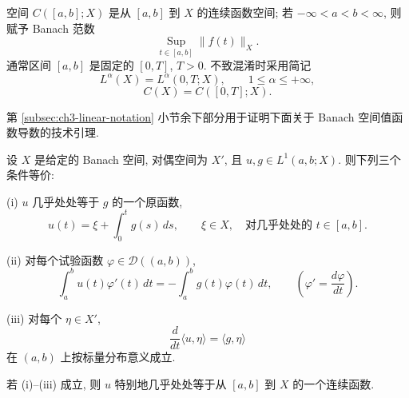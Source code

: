 \hypertarget{chapter-03-page-184}{}
空间 $C([a,b];X)$ 是从 $[a,b]$ 到 $X$ 的连续函数空间; 若 $-\infty<a<b<\infty$, 则赋予 Banach 范数
\begin{equation}
\operatorname*{Sup}_{t\in[a,b]}\lVert f(t)\rVert_X.
\label{eq:ch3-linear-continuous-function-norm}
\end{equation}
通常区间 $[a,b]$ 是固定的 $[0,T]$, $T>0$. 不致混淆时采用简记
\begin{equation}
L^\alpha(X)=L^\alpha(0,T;X),
\qquad1\leq\alpha\leq+\infty,
\label{eq:ch3-linear-condensed-lp-notation}
\end{equation}
\begin{equation}
C(X)=C([0,T];X).
\label{eq:ch3-linear-condensed-c-notation}
\end{equation}

第 \ref{subsec:ch3-linear-notation} 小节余下部分用于证明下面关于 Banach 空间值函数导数的技术引理.

\begin{Lemma}
\label{lem:ch3-linear-banach-valued-derivative}
设 $X$ 是给定的 Banach 空间, 对偶空间为 $X'$, 且 $u,g\in L^1(a,b;X)$. 则下列三个条件等价:

(i) $u$ 几乎处处等于 $g$ 的一个原函数,
\begin{equation}
u(t)=\xi+\int_0^t g(s)\,ds,
\qquad \xi\in X,
\quad\text{对几乎处处的 }t\in[a,b].
\label{eq:ch3-linear-banach-primitive}
\end{equation}

(ii) 对每个试验函数 $\varphi\in\mathcal D((a,b))$,
\begin{equation}
\int_a^b u(t)\varphi'(t)\,dt
=-\int_a^b g(t)\varphi(t)\,dt,
\qquad \left(\varphi'=\frac{d\varphi}{dt}\right).
\label{eq:ch3-linear-banach-weak-derivative}
\end{equation}

(iii) 对每个 $\eta\in X'$,
\begin{equation}
\frac d{dt}\langle u,\eta\rangle=\langle g,\eta\rangle
\label{eq:ch3-linear-banach-scalar-distribution}
\end{equation}
在 $(a,b)$ 上按标量分布意义成立.

若 (i)--(iii) 成立, 则 $u$ 特别地几乎处处等于从 $[a,b]$ 到 $X$ 的一个连续函数.
\end{Lemma}

